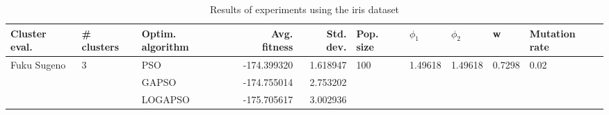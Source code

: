 \begin{table}
\centering
\caption{Results of experiments using the iris dataset}
\begin{tabular}{lllrrlllll}
\toprule
               Cluster eval. &        \# clusters & Optim. algorithm &  Avg. fitness &  Std. dev. &            Pop. size &               $\phi_{1}$ &               $\phi_{2}$ &                       w &         Mutation rate \\
\midrule
\multirow{3}{*}{Fuku Sugeno} & \multirow{3}{*}{3} &              PSO &   -174.399320 &   1.618947 & \multirow{3}{*}{100} & \multirow{3}{*}{1.49618} & \multirow{3}{*}{1.49618} & \multirow{3}{*}{0.7298} & \multirow{3}{*}{0.02} \\
                             &                    &            GAPSO &   -174.755014 &   2.753202 &                      &                          &                          &                         &                       \\
                             &                    &          LOGAPSO &   -175.705617 &   3.002936 &                      &                          &                          &                         &                       \\
\bottomrule
\end{tabular}
\end{table}
